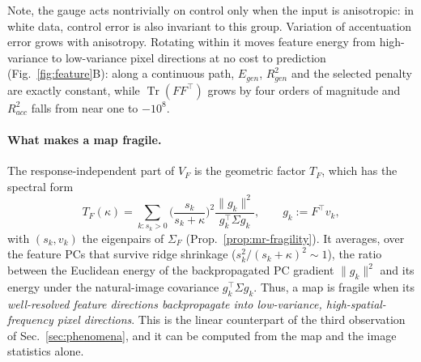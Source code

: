 Note, the gauge acts nontrivially on control only when the input is anisotropic: in white data, control error is also invariant to this group.
Variation of accentuation error grows with anisotropy. Rotating within it moves feature energy from high-variance to low-variance pixel directions at no cost to prediction (Fig.~\ref{fig:feature}B): along a continuous path, $E_{gen}$, $R^2_{gen}$ and the selected penalty are exactly constant, while $\operatorname{Tr}(FF^\top)$ grows by four orders of magnitude and $R^2_{acc}$ falls from near one to $-10^{8}$.


\paragraph{What makes a map fragile.}
The response-independent part of $V_F$ is the geometric factor $T_F$, which has the spectral form
\begin{equation}
T_F(\kappa)=\sum_{k:s_k>0}\Big(\frac{s_k}{s_k+\kappa}\Big)^2\frac{\|g_k\|^2}{g_k^\top\Sigma g_k},
\qquad g_k:=F^\top v_k,
\label{eq:TF}
\end{equation}
with $(s_k,v_k)$ the eigenpairs of $\Sigma_F$ (Prop.~\ref{prop:mr-fragility}). It averages, over the feature PCs that survive ridge shrinkage ($s_k^2/(s_k+\kappa)^2\sim1$), the ratio between the Euclidean energy of the backpropagated PC gradient $\|g_k\|^2$ and its energy under the natural-image covariance $g_k^\top\Sigma g_k$. Thus, a map is fragile when its \textit{well-resolved feature directions backpropagate into low-variance, high-spatial-frequency pixel directions}. This is the linear counterpart of the third observation of Sec.~\ref{sec:phenomena}, and it can be computed from the map and the image statistics alone.

